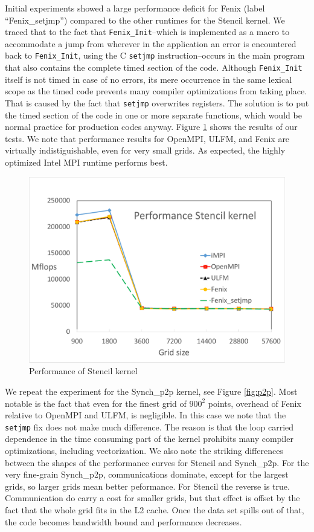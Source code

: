 Initial experiments showed a large performance deficit for Fenix (label ``Fenix\_setjmp'')
compared to the other runtimes for the Stencil kernel.
We traced that to the fact that \texttt{Fenix\_Init}--which is implemented as a macro to
accommodate a jump from wherever in the application an error is encountered back
to \texttt{Fenix\_Init}, using the C \texttt{setjmp} instruction--occurs in the
main program that also contains the complete timed section of the code.
Although \texttt{Fenix\_Init} itself is not timed in case of no errors, its mere occurrence
in the same lexical scope as the timed code prevents many compiler optimizations from
taking place.
That is caused by the fact that \texttt{setjmp} overwrites registers.
The solution is to put the timed section of the code in one or more separate functions,
which would be normal practice for production codes anyway.
Figure \ref{fig:stencil} shows the results of our tests. We note that performance results
for OpenMPI, ULFM, and Fenix are virtually indistiguishable, even for very small grids.
As expected, the highly optimized Intel MPI runtime performs best.

\begin{figure}
  \centering
  \includegraphics[width=\columnwidth]{stencil_overheads-crop.pdf}
  \caption{Performance of Stencil kernel}
  \label{fig:stencil}
\end{figure}

We repeat the experiment for the Synch\_p2p kernel, see Figure \ref{fig:p2p}.
Most notable is the fact that even for the finest grid of $900^2$ points,
overhead of Fenix relative to OpenMPI and ULFM, is negligible.
In this case we note that the \texttt{setjmp} fix does not make much
difference.
The reason is that the loop carried dependence in the time consuming part of
the kernel prohibits many compiler optimizations, including vectorization.
We also note the striking differences between the shapes of the performance
curves for Stencil and Synch\_p2p.
For the very fine-grain Synch\_p2p, communications dominate, except for the largest
grids, so larger grids mean better peformance.
For Stencil the reverse is true. Communication do carry a cost for smaller grids,
but that effect is offset by the fact that the whole grid fits in the L2 cache.
Once the data set spills out of that, the code becomes bandwidth bound and
performance decreases.

